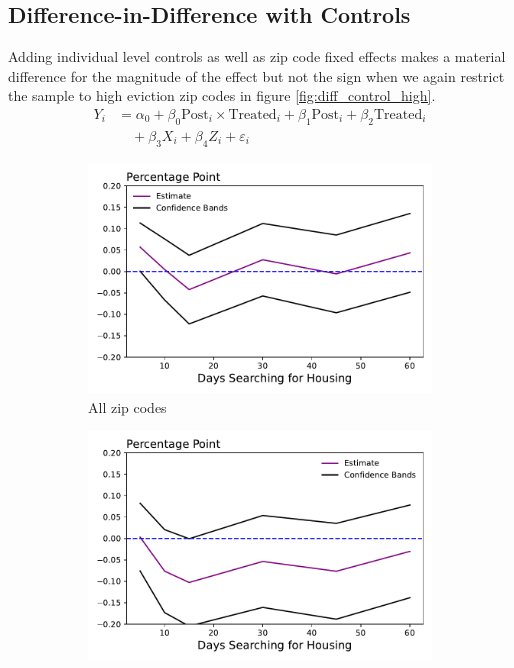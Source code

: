 \documentclass[a4paper,12pt]{article}
\begin{document}
\subsection{Difference-in-Difference with Controls}
Adding individual level controls as well as zip code fixed effects makes a material difference for the magnitude of the effect but not the sign when we again restrict the sample to high eviction zip codes in figure \ref{fig:diff_control_high}.
\begin{align*}
    Y_i &= \alpha _0 + \beta_0 \textrm{Post}_i \times \textrm{Treated}_i + \beta_1  \textrm{Post}_i + \beta_2 \textrm{Treated}_i \\ 
    &\quad + \beta _3X_i + \beta_4 Z_i + \varepsilon_i
\end{align*}
\begin{figure}[htbp]
\centering
\begin{subfigure}{.48\textwidth}
    \centering
    \includegraphics[width=.95\linewidth]{figures/rtc/results/cceh/linear_reg_False_False.pdf}
    \caption{All zip codes}
    \label{SUBFIGURE LABEL 3}
\end{subfigure}
\begin{subfigure}{.48\textwidth}
    \centering
    \includegraphics[width=.95\linewidth]{figures/rtc/results/cceh/linear_reg_True_False.pdf}

\end{subfigure}
\end{figure}
\end{document}
